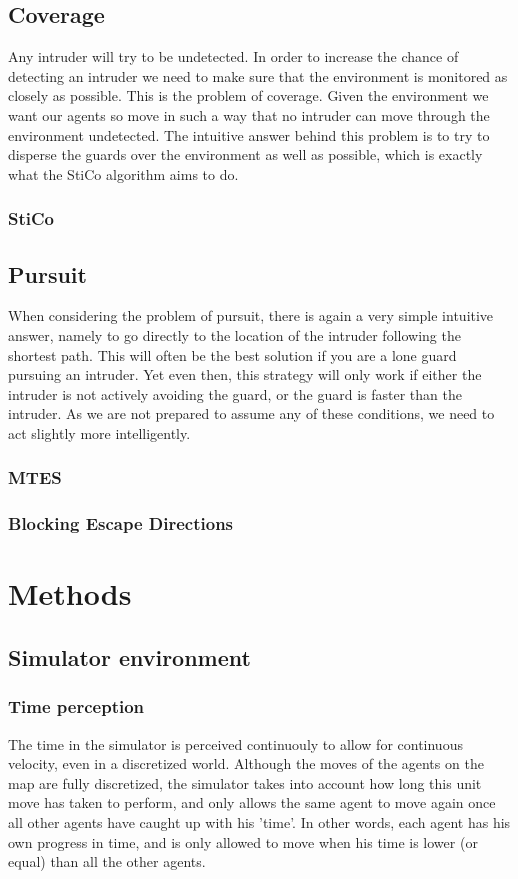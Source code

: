 \documentclass[a4paper]{report}
\begin{document}
	\section{Coverage}
		Any intruder will try to be undetected. In order to increase the chance of detecting an intruder we need to make sure that the environment is monitored as closely as possible. This is the problem of coverage. Given the environment we want our agents so move in such a way that no intruder can move through the environment undetected. The intuitive answer behind this problem is to try to disperse the guards over the environment as well as possible, which is exactly what the StiCo algorithm aims to do.
	
		\subsection{StiCo}
				

	\section{Pursuit}
		When considering the problem of pursuit, there is again a very simple intuitive answer, namely to go directly to the location of the intruder following the shortest path. This will often be the best solution if you are a lone guard pursuing an intruder. Yet even then, this strategy will only work if either the intruder is not actively avoiding the guard, or the guard is faster than the intruder. As we are not prepared to assume any of these conditions, we need to act slightly more intelligently.

		\subsection{MTES}
			

		\subsection{Blocking Escape Directions}
			

\chapter{Methods}
	\section{Simulator environment}
		\subsection{Time perception}
			The time in the simulator is perceived continuouly to allow for continuous velocity, even in a discretized world. Although the moves of the agents on the map are fully discretized, the simulator takes into account how long this unit move has taken to perform, and only allows the same agent to move again once all other agents have caught up with his 'time'. In other words, each agent has his own progress in time, and is only allowed to move when his time is lower (or equal) than all the other agents.
\end{document}
